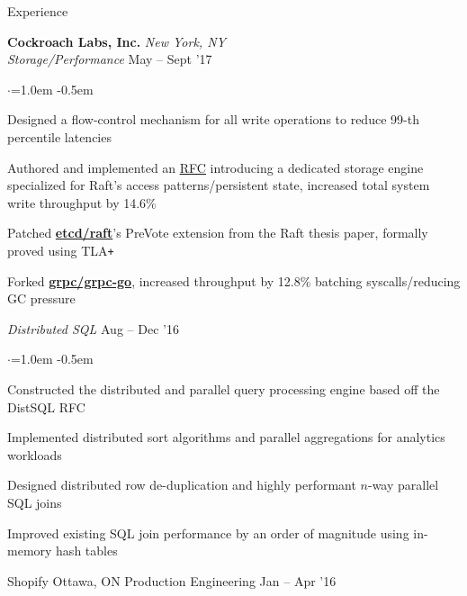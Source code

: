 \documentclass{resume} %
\begin{document}
\begin{rSection}{Experience}


  {\bf Cockroach Labs, Inc.}  \hfill  {\em New York, NY}
  \\
  {\em Storage/Performance}  \hfill  {May -- Sept '17}
  \smallskip
  \begin{list}{$\cdot$}{\leftmargin=1.0em}
  \itemsep -0.5em \vspace{-0.5em}
    \item Designed a flow-control mechanism for all write operations to reduce
      99-th percentile latencies
    \item Authored and implemented an
      \href{https://github.com/cockroachdb/cockroach/pull/16361}{\underline {RFC}} introducing
      a dedicated storage
      engine specialized for Raft's access patterns/persistent state, increased
      total system write throughput by 14.6\%
    \item Patched
      \href{https://github.com/coreos/etcd/pull/8288}{\textbf{etcd/raft}}'s
      PreVote extension from the Raft thesis paper, formally proved using TLA\texttt{+}
    \item Forked \href{https://github.com/irfansharif/grpc-go}{\textbf{grpc/grpc-go}},
      increased throughput by 12.8\% batching syscalls/reducing GC pressure

  \end{list}
  {\em Distributed SQL}  \hfill  {Aug -- Dec '16}
  \smallskip
  \begin{list}{$\cdot$}{\leftmargin=1.0em}
  \itemsep -0.5em \vspace{-0.5em}
    \item Constructed the distributed and parallel query processing engine
      based off the DistSQL RFC
    \item Implemented distributed sort algorithms and parallel aggregations for
      analytics workloads
    \item Designed distributed row de-duplication and highly performant $n$-way
      parallel SQL joins
    \item Improved existing SQL join performance by an order of magnitude using
      in-memory hash tables
  \end{list}
  \vspace{0.5em}

  \begin{rSubsection}{Shopify}
                     {Ottawa, ON}
                     {Production Engineering}
                     {Jan -- Apr '16}


\end{rSubsection}
\end{rSection}
\end{document}
